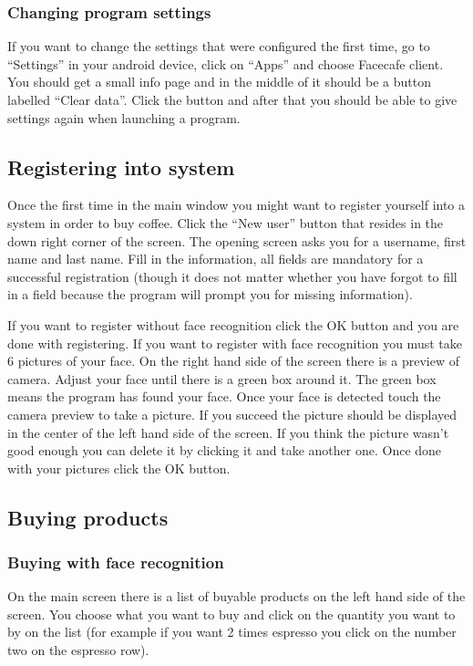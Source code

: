 \documentclass[11pt]{article}
\begin{document}
\subsubsection*{Changing program settings}

If you want to change the settings that were configured the first time, go to “Settings” in your android device, click on “Apps” and choose Facecafe client. You should get a small info page and in the middle of it should be a button labelled “Clear data”. Click the button and after that you should be able to give settings again when launching a program.


\subsection{Registering into system}

Once the first time in the main window you might want to register yourself into a system in order to buy coffee. Click the “New user” button that resides in the down right corner of the screen. The opening screen asks you for a username, first name and last name. Fill in the information, all fields are mandatory for a successful registration (though it does not matter whether you have forgot to fill in a field because the program will prompt you for missing information).

If you want to register without face recognition click the OK button and you are done with registering. If you want to register with face recognition you must take 6 pictures of your face. On the right hand side of the screen there is a preview of camera. Adjust your face until there is a green box around it. The green box means the program has found your face. Once your face is detected touch the camera preview to take a picture. If you succeed the picture should be displayed in the center of the left hand side of the screen. If you think the picture wasn’t good enough you can delete it by clicking it and take another one. Once done with your pictures click the OK button.

\subsection{Buying products}

\subsubsection*{Buying with face recognition}
On the main screen there is a list of buyable products on the left hand side of the screen. You choose what you want to buy and click on the quantity you want to by on the list (for example if you want 2 times espresso you click on the number two on the espresso row).
\end{document}
